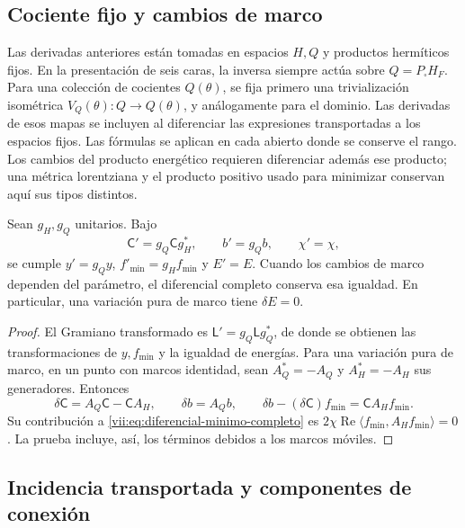 \subsection{Cociente fijo y cambios de marco}
\label{vii:subsec:marcos-minimo}

Las derivadas anteriores están tomadas en espacios \(H,Q\) y productos
hermíticos fijos. En la presentación de seis caras, la inversa siempre
actúa sobre \(Q=P_\square H_F\). Para una colección de cocientes
\(Q(\theta)\), se fija primero una trivialización isométrica
\(V_Q(\theta):Q\to Q(\theta)\), y análogamente para el dominio.
Las derivadas de esos mapas se incluyen al diferenciar las expresiones
transportadas a los espacios fijos. Las fórmulas se aplican en cada
abierto donde se conserve el rango. Los cambios del producto energético
requieren diferenciar además ese producto; una métrica lorentziana
y el producto positivo usado para minimizar conservan aquí sus tipos
distintos.

\begin{proposition}
\label{vii:prop:covariancia-minimo}
Sean \(g_H,g_Q\) unitarios. Bajo
\[
 \mathsf C'=g_Q\mathsf C g_H^*,\qquad b'=g_Qb,\qquad \chi'=\chi,
\]
se cumple \(y'=g_Qy\), \(f'_{\min}=g_Hf_{\min}\) y \(E'=E\).
Cuando los cambios de marco dependen del parámetro, el diferencial
completo conserva esa igualdad. En particular, una variación pura de
marco tiene \(\delta E=0\).
\end{proposition}

\begin{proof}
El Gramiano transformado es \(\mathsf L'=g_Q\mathsf Lg_Q^*\),
de donde se obtienen las transformaciones de \(y,f_{\min}\) y
la igualdad de energías. Para una variación pura de marco, en un punto
con marcos identidad, sean \(A_Q^*=-A_Q\) y \(A_H^*=-A_H\)
sus generadores. Entonces
\[
 \delta\mathsf C=A_Q\mathsf C-\mathsf C A_H,\qquad
 \delta b=A_Qb,\qquad
 \delta b-(\delta\mathsf C)f_{\min}=\mathsf C A_Hf_{\min}.
\]
Su contribución a \eqref{vii:eq:diferencial-minimo-completo} es
\(2\chi\operatorname{Re}\langle f_{\min},A_Hf_{\min}\rangle=0\).
La prueba incluye, así, los términos debidos a los marcos móviles.
\end{proof}

\subsection{Incidencia transportada y componentes de conexión}
\label{vii:subsec:incidencia-conexion-minima}

